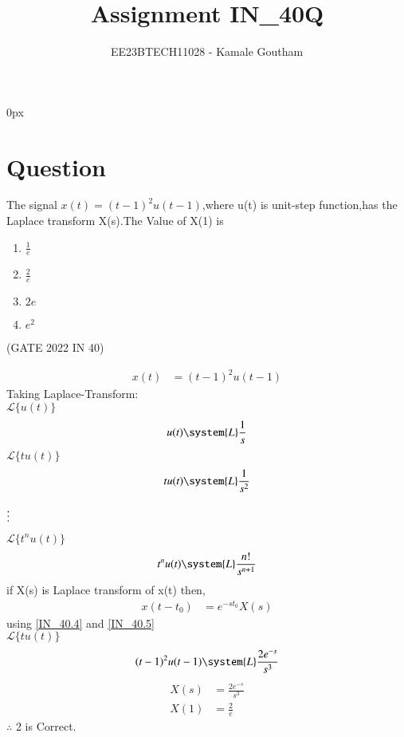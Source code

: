 \documentclass[journal,12pt,twocolumn]{IEEEtran}
\theoremstyle{remark}
\begin{document}
\parindent 0px

\title{Assignment IN\_40Q}
\author{EE23BTECH11028 - Kamale Goutham$^{}$%
}
\maketitle
\newpage
\bigskip
\section*{Question}
The signal $x(t)=(t-1)^2u(t-1)$,where u(t) is unit-step function,has the Laplace transform X(s).The Value of X(1) is 
\begin{enumerate}
    \item $\frac{1}{e}$
    \item $\frac{2}{e}$
    \item $2e$
    \item $e^2$
\end{enumerate}
\hfill{(GATE 2022 IN 40)}\\
\solution

\begin{align}
    x(t)&=(t-1)^2u(t-1) 
\end{align}
  Taking Laplace-Transform:\\
  
     $\mathcal{L}\{u(t)\}$
\begin{align}
    u(t) \system{L} \frac{1}{s}  
\end{align}
    $\mathcal{L}\{tu(t)\}$ 
\begin{align}
    tu(t) \system{L} \frac{1}{s^2}
\end{align}
\begin{center}
     $ \vdots \notag$ \\
\end{center}
  $\mathcal{L}\{t^nu(t)\}$ 
\begin{align}
    t^nu(t) \system{L} \frac{n!}{s^{n+1}} \label{IN_40.4}
\end{align}
if X(s) is Laplace transform of x(t) then,\\
\begin{align}
  x(t-t_0)&=e^{-st_0}X(s)\label{IN_40.5}
\end{align}
using \ref{IN_40.4} and \ref{IN_40.5}\\
 $\mathcal{L}\{tu(t)\}$ 
\begin{align}
    (t-1)^2u(t-1) \system{L} \frac{2e^{-s}}{s^3}
\end{align}
\begin{align}
    X(s)&=\frac{2e^{-s}}{s^3}\\
    X(1)&=\frac{2}{e}
\end{align}
$\therefore$ 2 is Correct.
\end{document}
